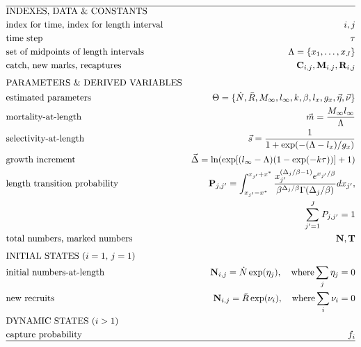 \begin{table}
  \centering
\caption{Data, parameters, and analytical procedures for the length-based mark-recapture model.}\label{table:LSMRmodel} 
\tableEq
	\begin{small}
    \begin{align}
        \hline
		&\mbox{INDEXES, DATA \& CONSTANTS} \nonumber\\
		&\mbox{index for time, index for length interval} 
		&i,j \label{eq:T1.1}\\ 
		&\mbox{time step}  & \tau\\
		&\mbox{set of midpoints of length intervals}
		&\Lambda = \{x_1, \ldots,x_J\}\\
		&\mbox{catch, new marks, recaptures} 
		&\mathbf{C}_{i,j}, \mathbf{M}_{i,j}, \mathbf{R}_{i,j}\\[1ex]
		&\mbox{PARAMETERS \& DERIVED VARIABLES} \nonumber\\
		&\mbox{estimated parameters} 
		&\Theta=\{\dot{N},\bar{R},M_\infty,l_\infty,k,\beta,l_x,g_x,
			\vec{\eta},\vec{\nu} \}\\
		&\mbox{mortality-at-length} 
		& \vec{m} = \frac{M_\infty l_\infty}{\Lambda}
		\label{eq:T1.6}\\
		&\mbox{selectivity-at-length} 
		& \vec{s} = \frac{1}{1+\exp(-(\Lambda-l_x)/g_x)}
		\label{eq:T1.7}\\
		&\mbox{growth increment} 
		& \vec{\Delta} = \ln( \exp[(l_\infty-\Lambda)(1-\exp(-k \tau))] +1)
		\label{eq:T1.8}\\
		&\mbox{length transition probability}
		& \mathbf{P}_{j,j'} =\int_{x_{j'}-x^*}^{x_{j'}+x^*} \frac{x_{j'}^{(\Delta_{j}/\beta-1)}
		e^{x_{j'}/\beta}}{\beta^{\Delta_{j}/\beta} \Gamma(\Delta_{j}/\beta)}dx_{j'}, \nonumber\\
		& &\quad \sum_{j'=1}^J P_{j,j'}= 1 
		\label{eq:T1.9}\\
		&\mbox{total numbers, marked numbers} 
		& \mathbf{N}, \mathbf{T}\\[1ex]
		&\mbox{INITIAL STATES ($i=1$, $j=1$)}  \nonumber\\
		&\mbox{initial numbers-at-length}
		&\mathbf{N}_{i,j} = \dot{N}\exp(\eta_j), \quad \mbox{where} \sum_j \eta_j=0
		\label{eq:T1.11}\\
		&\mbox{new recruits}
		&\mathbf{N}_{i,j} = \bar{R}\exp(\nu_i), \quad \mbox{where} \sum_i \nu_i=0
		\label{eq:T1.12}\\
		&\mbox{DYNAMIC STATES ($i>1$)} \nonumber\\
		&\mbox{capture probability} 
		& f_i\\
		\hline \nonumber
    \end{align}
\end{small}
    \normalEq
\end{table}

